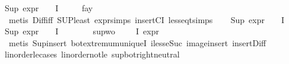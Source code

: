 \begin{isabellebody}
{\isachardoublequoteopen}Sup\ {\isacharparenleft}{\kern0pt}expr{\isacharunderscore}{\kern0pt}{}\ {\isacharbackquote}{\kern0pt}\ {\isacharparenleft}{\kern0pt}{\isacharparenleft}{\kern0pt}{\isasymPhi}\ {\isacharbackquote}{\kern0pt}\ I{\isacharparenright}{\kern0pt}\ {\isacharminus}{\kern0pt}\ {\isacharbraceleft}{\kern0pt}{\isasympsi}{\isacharbraceright}{\kern0pt}{\isacharparenright}{\kern0pt}{\isacharparenright}{\kern0pt}\ {\isasymle}\ {}{\isachardoublequoteclose}\isanewline
{}\isamarkupfalse%
\ fa{\isacharunderscore}{\kern0pt}y\isanewline
\ \ \isamarkupfalse%
\ {\isacharparenleft}{\kern0pt}metis\ Diff{\isacharunderscore}{\kern0pt}iff\ SUP{\isacharunderscore}{\kern0pt}least\ expr{\isachardot}{\kern0pt}simps\ insertCI\ less{\isacharunderscore}{\kern0pt}eq{\isacharunderscore}{\kern0pt}t{\isachardot}{\kern0pt}simps{\isacharparenright}{\kern0pt}{\isacharplus}{\kern0pt}\isanewline
\isanewline
\ \ \isamarkupfalse%
\ {\isachardoublequoteopen}Sup\ {\isacharparenleft}{\kern0pt}expr{\isacharunderscore}{\kern0pt}{}\ {\isacharbackquote}{\kern0pt}\ {\isacharparenleft}{\kern0pt}{\isasymPhi}\ {\isacharbackquote}{\kern0pt}\ I{\isacharparenright}{\kern0pt}{\isacharparenright}{\kern0pt}\ {\isasymle}\ {}{\isachardoublequoteclose}\isanewline
{\isachardoublequoteopen}Sup\ {\isacharparenleft}{\kern0pt}expr{\isacharunderscore}{\kern0pt}{}\ {\isacharbackquote}{\kern0pt}\ {\isacharparenleft}{\kern0pt}{\isasymPhi}\ {\isacharbackquote}{\kern0pt}\ I{\isacharparenright}{\kern0pt}{\isacharparenright}{\kern0pt}\ {\isasymle}\ {}{\isachardoublequoteclose}\isanewline
\ \ \ \ \isamarkupfalse%
\ sup{\isacharunderscore}{\kern0pt}wo{\isacharunderscore}{\kern0pt}{\isasympsi}{\isacharparenleft}{\kern0pt}{}{\isacharparenright}{\kern0pt}\ {\isacartoucheopen}{\isasympsi}\ {\isasymin}\ {\isasymPhi}\ {\isacharbackquote}{\kern0pt}\ I{\isacartoucheclose}\ {\isacartoucheopen}expr{\isacharunderscore}{\kern0pt}{}\ {\isasympsi}\ {\isasymle}\ {}{\isacartoucheclose}\isanewline
\ \ \ \ \ \isamarkupfalse%
\ {\isacharparenleft}{\kern0pt}metis\ Sup{\isacharunderscore}{\kern0pt}insert\ bot{\isachardot}{\kern0pt}extremum{\isacharunderscore}{\kern0pt}uniqueI\ iless{\isacharunderscore}{\kern0pt}eSuc{}\ image{\isacharunderscore}{\kern0pt}insert\ insert{\isacharunderscore}{\kern0pt}Diff\ \isanewline
linorder{\isacharunderscore}{\kern0pt}le{\isacharunderscore}{\kern0pt}cases\ linorder{\isacharunderscore}{\kern0pt}not{\isacharunderscore}{\kern0pt}le\ sup{\isacharunderscore}{\kern0pt}bot{\isachardot}{\kern0pt}right{\isacharunderscore}{\kern0pt}neutral{\isacharparenright}{\kern0pt}\isanewline

\end{isabellebody}
